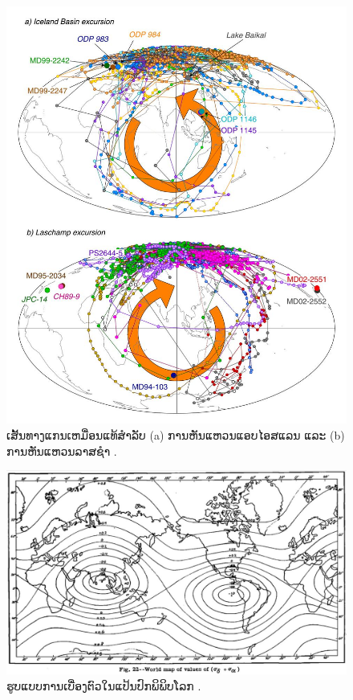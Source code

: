 \documentclass[10pt,twocolumn,letterpaper]{article}
\begin{document}
\begin{figure}[t]
\begin{center}
   \includegraphics[width=0.95\linewidth]{laj.jpg}
\end{center}
   \caption{ເສັ້ນທາງແກນເຫມື່ອນແທ້ສຳລັບ (a) ການຫັນແຫວນແອບໄອສແລນ ແລະ (b) ການຫັນແຫວນລາສຊຳ \cite{35}.}
\label{fig:7}
\label{fig:onecol}
\end{figure}

\begin{figure}[t]
\begin{center}
   \includegraphics[width=1\linewidth]{meinesz3.jpg}
\end{center}
   \caption{ຮູບແບບການເບື່ອງຕົວໃນແປ້ນປົກພິພິບໂລກ \cite{36}.}
\label{fig:8}
\label{fig:onecol}
\end{figure}
\end{document}
